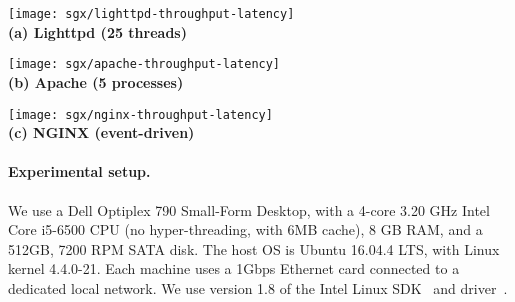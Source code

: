 \begin{figure*}[t!]
\centering

\begin{minipage}{.45\textwidth}
\centering
\footnotesize
\vspace{6pt}
\texttt{[image: sgx/lighttpd-throughput-latency]}\\
\vspace{3pt}
{\bf (a) Lighttpd (25 threads)}
\vspace{6pt}
\end{minipage}
\begin{minipage}{.45\textwidth}
\centering
\footnotesize
\vspace{6pt}
\texttt{[image: sgx/apache-throughput-latency]}\\
\vspace{3pt}
{\bf (b) Apache (5 processes)}
\vspace{6pt}
\end{minipage}
\begin{minipage}{.45\textwidth}
\centering
\footnotesize
\vspace{6pt}
\texttt{[image: sgx/nginx-throughput-latency]}\\
\vspace{3pt}
{\bf (c) NGINX (event-driven)}
\vspace{6pt}
\end{minipage}

\caption{Throughput versus latency of web server workloads, including Lighttpd, Apache, and NGINX, on native Linux, \graphene{}, and \graphenesgx{}.
We use an ApacheBench client to gradually increase load, and plot
throughput versus latency at each point.  Lower and further right
is better.
}
\label{fig:server-throughput-latency}
\end{figure*}



\paragraph{Experimental setup.}

We use a Dell Optiplex 790 Small-Form Desktop,
with a 4-core 3.20 GHz Intel Core i5-6500 CPU (no hyper-threading, with 6MB cache),
8 GB RAM, and a 512GB, 7200 RPM SATA disk.
The host OS is Ubuntu 16.04.4 LTS, with Linux kernel 4.4.0-21.
Each machine uses a 1Gbps Ethernet card connected to a dedicated local network.
We use version 1.8 of 
the Intel \sgx{} Linux SDK~\cite{intel-sgx-linux-sdk} and driver~\cite{intel-sgx-linux-driver}.

